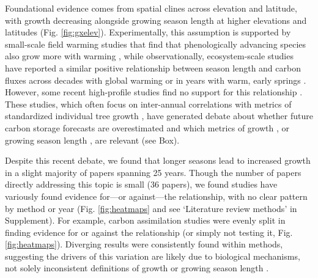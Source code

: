 \documentclass[11pt]{article}
\newcommand{\R}[1]{\label{#1}\linelabel{#1}}
\begin{document}
Foundational evidence comes from spatial clines across elevation and latitude, with growth decreasing alongside growing season length at higher elevations and latitudes (Fig. \ref{fig:gxelev}). Experimentally, this assumption is supported by small-scale field warming studies that find that phenologically advancing species also grow more with warming \citep[][]{Cleland:2012}, while observationally, ecosystem-scale studies have reported a similar positive relationship between season length and carbon fluxes across decades with global warming \citep{keenan2014net} or in years with warm, early springs \citep{chen1999effects}. However, some recent high-profile studies find no support for this relationship \citep{dow2022warm}. These studies, which often focus on inter-annual correlations with metrics of standardized individual tree growth \citep{dow2022warm,silvestro2023longer}, have generated debate about whether future carbon storage forecasts are overestimated and which metrics of growth \citep{green2022limits}, or growing season length \citep{korner2023four}, are relevant (see Box).\R{R1box0}

Despite this recent debate, we found that longer seasons lead to increased growth in a slight majority of papers spanning  25 years. Though the number of papers directly addressing this topic is small (36 papers), we found studies have variously found evidence for---or against---the relationship, with no clear pattern by method or year (Fig. \ref{fig:heatmaps} and see `Literature review methods' in Supplement). For example, carbon assimilation studies were evenly split in finding evidence for or against the relationship  (or simply not testing it, Fig. \ref{fig:heatmaps}). Diverging results were consistently found within methods, suggesting the drivers of this variation are likely due to biological mechanisms, not solely inconsistent definitions of growth or growing season length \citep[as some have recently suggested, e.g.][and see Box]{green2022limits,korner2023four}. 
\end{document}
